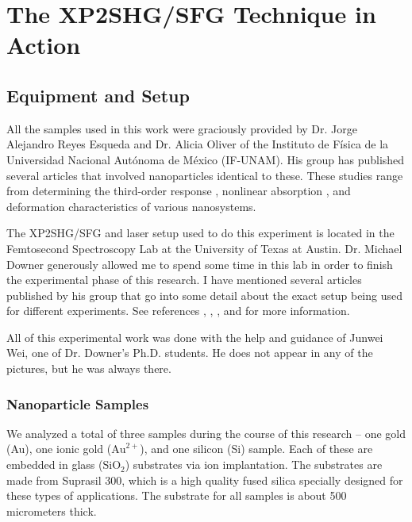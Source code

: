 \chapter{The XP2SHG/SFG Technique in Action}\label{chap_setup}
\minitoc
\section{Equipment and Setup}
All the samples used in this work were graciously provided by Dr. Jorge Alejandro Reyes Esqueda and Dr. Alicia Oliver of the Instituto de F\'isica de la Universidad Nacional Aut\'onoma de M\'exico (IF-UNAM). His group has published several articles that involved nanoparticles identical to these. These studies range from determining the third-order response \cite{torres2008optical, rodriguez2009large}, nonlinear absorption \cite{fernandez2011nonlinear, reyes2009anisotropic}, and deformation characteristics \cite{silva2010high, rocha2011second} of various nanosystems.

The XP2SHG/SFG and laser setup used to do this experiment is located in the Femtosecond Spectroscopy Lab at the University of Texas at Austin. Dr. Michael Downer generously allowed me to spend some time in this lab in order to finish the experimental phase of this research. I have mentioned several articles published by his group that go into some detail about the exact setup being used for different experiments. See references \cite{figliozzi2005single}, \cite{wirth2008second}, \cite{PhysRevB.84.165316}, and \cite{figliozzi2007shg} for more information.

All of this experimental work was done with the help and guidance of Junwei Wei, one of Dr. Downer's Ph.D. students. He does not appear in any of the pictures, but he was always there.

\subsection{Nanoparticle Samples}

We analyzed a total of three samples during the course of this research -- one gold (Au), one ionic gold ($\text{Au}^{2+}$), and one silicon (Si) sample. Each of these are embedded in glass ($\text{SiO}_{2}$) substrates via ion implantation. The substrates are made from Suprasil 300, which is a high quality fused silica specially designed for these types of applications. The substrate for all samples is about 500 micrometers thick.

